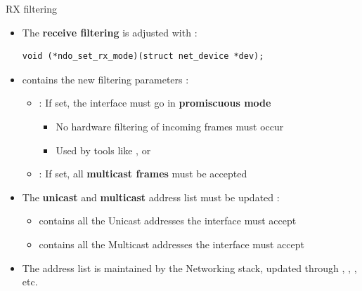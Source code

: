 \begin{frame}[fragile]{RX filtering}
	\begin{itemize}
		\item The \textbf{receive filtering} is adjusted with :
	\begin{verbatim}
void (*ndo_set_rx_mode)(struct net_device *dev);
	\end{verbatim}
	\item {} contains the new filtering parameters :
		\begin{itemize}
			\item {} : If set, the interface must go in \textbf{promiscuous mode}
			\begin{itemize}
				\item No hardware filtering of incoming frames must occur
				\item Used by tools like , or 
			\end{itemize}
			\item {} : If set, all \textbf{multicast frames} must be accepted
		\end{itemize}
	\item The \textbf{unicast} and \textbf{multicast} address list must be updated :
		\begin{itemize}
			\item {} contains all the Unicast addresses the interface must accept
			\item {} contains all the Multicast addresses the interface must accept
		\end{itemize}
	\item The address list is maintained by the Networking stack, updated through , , , etc.
	\end{itemize}

\end{frame}

